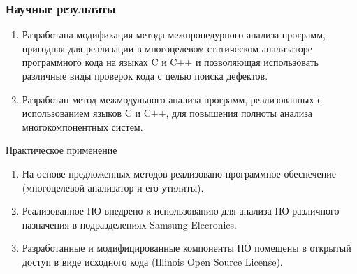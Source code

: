 \documentclass[hyperref={pdfpagelabels=false},10pt,gray]{beamer}
\begin{document}


\begin{frame}
\frametitle{Научные результаты}

\begin{enumerate}
  \item Разработана модификация метода межпроцедурного анализа программ, пригодная для реализации в многоцелевом статическом анализаторе программного кода на языках C и C++ и позволяющая использовать различные виды проверок кода с целью поиска дефектов.
  \item Разработан метод межмодульного анализа программ, реализованных с использованием языков C и C++, для повышения полноты анализа многокомпонентных систем.
\end{enumerate}

{\Large Практическое применение}
\begin{enumerate}
  \item На основе предложенных методов реализовано программное обеспечение (многоцелевой анализатор и его утилиты).
  \item Реализованное ПО внедрено к использованию для анализа ПО различного назначения в подразделениях Samsung Elecronics.
  \item Разработанные и модифицированные компоненты ПО помещены в открытый доступ в виде исходного кода (Illinois Open Source License).
\end{enumerate}

\end{frame}
\end{document}
